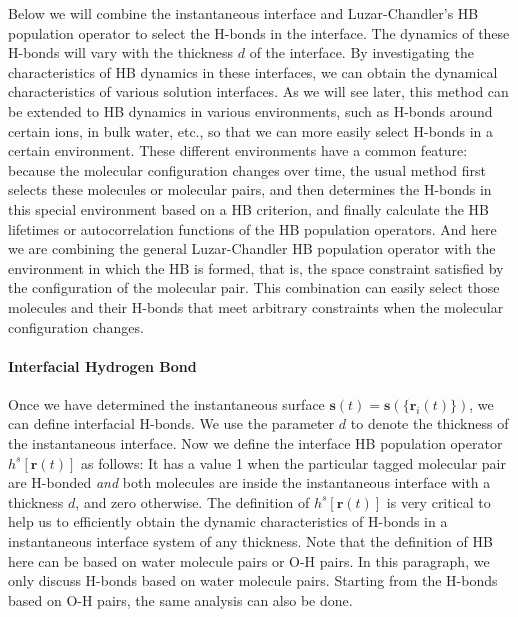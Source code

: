 {Below we will combine the instantaneous interface and Luzar-Chandler's HB population operator \cite{AL96} to select the H-bonds 
in the interface. The dynamics of these H-bonds will vary with the thickness $d$ of the interface. By investigating the characteristics of HB dynamics
in these interfaces, we can obtain the dynamical characteristics of various solution interfaces. As we will see later, this method can be extended to HB dynamics 
in various environments, such as H-bonds around certain ions, in bulk water, etc., so that we can more easily select H-bonds in a certain environment. 
These different environments have a common feature: because the molecular configuration changes over time, the usual method first selects these molecules or molecular pairs, 
and then determines the H-bonds in this special environment based on a HB criterion, and finally calculate the HB lifetimes or autocorrelation functions of 
the HB population operators. And here we are combining the general Luzar-Chandler HB population operator with the environment in which the HB is formed,
 that is, the space constraint satisfied by the configuration of the molecular pair. This combination can easily select those molecules and their H-bonds that meet arbitrary 
constraints when the molecular configuration changes.

\paragraph{Interfacial Hydrogen Bond}
Once we have determined the instantaneous surface ${\mathbf s}(t)={\mathbf s}(\{{\mathbf r}_i(t)\})$, we can define interfacial H-bonds.
We use the parameter $d$ to denote the thickness of the instantaneous interface.
Now we define the interface HB population operator $h^{s}[{\mathbf r}(t)]$ as follows:
It has a value 1 when the particular tagged molecular pair are H-bonded \emph{and} both molecules are inside the instantaneous interface 
with a thickness $d$, and zero otherwise. 
The definition of  $h^{s}[{\mathbf r}(t)]$ is very critical to help us to efficiently obtain the dynamic characteristics of H-bonds in a
instantaneous interface system of any thickness. Note that the definition of HB here can be based on water molecule pairs or O-H pairs. 
In this paragraph, we only discuss H-bonds based on water molecule pairs. Starting from the H-bonds based on O-H pairs, the same analysis 
can also be done. 

}
